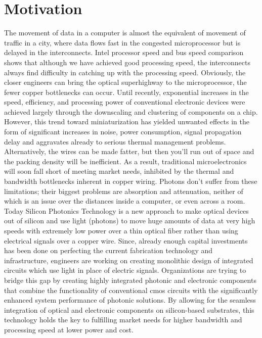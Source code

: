 \documentclass[../report.tex]{subfiles}
\begin{document}
	\section{Motivation}
The movement of data in a computer is almost the equivalent of movement of traffic in a city, where data flows fast in the congested microprocessor but is delayed in the interconnects. Intel processor speed and bus speed comparison \cite{intel_proc_compare} shows that although we have achieved good processing speed, the interconnects always find difficulty in catching up with the processing speed. Obviously, the closer engineers can bring the optical superhighway to the microprocessor, the fewer copper bottlenecks can occur. Until recently, exponential increases in the speed, efficiency, and processing power of conventional electronic devices were achieved largely through the downscaling and clustering of components on a chip. However, this trend toward miniaturization has yielded unwanted effects in the form of significant increases in noise, power consumption, signal propagation delay and aggravates already to serious thermal management problems. Alternatively, the wires can be made fatter, but then you'll run out of space and the packing density will be inefficient.  As a result, traditional microelectronics will soon fall short of meeting market needs, inhibited by the thermal and bandwidth bottlenecks inherent in copper wiring. Photons don't suffer from these limitations; their biggest problems are absorption and attenuation, neither of which is an issue over the distances inside a computer, or even across a room. Today Silicon Photonics \cite{silicon_photonics} Technology is a new approach to make optical devices out of silicon and use light (photons) to move huge amounts of data at very high speeds with extremely low power over a thin optical fiber rather than using electrical signals over a copper wire. Since, already enough capital investments has been done on perfecting the current fabrication technology and infrastructure, engineers are working on creating monolithic design of integrated circuits which use light in place of electric signals. Organizations are trying to bridge this gap by creating highly integrated photonic and electronic components that combine the functionality of conventional \gls{cmos} circuits with the significantly enhanced system performance of photonic solutions. By allowing for the seamless integration of optical and electronic components on silicon-based substrates, this technology holds the key to fulfilling market needs for higher bandwidth and processing speed at lower power and cost.\par
\end{document}
